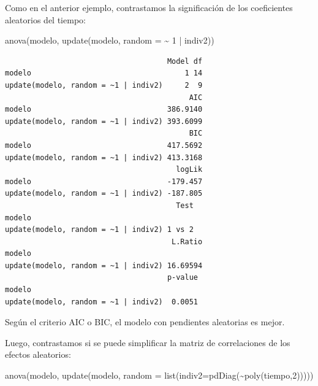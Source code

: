 \documentclass[
]{book}
\newenvironment{Shaded}{\begin{snugshade}}{\end{snugshade}}
\newcommand{\AttributeTok}[1]{\textcolor[rgb]{0.77,0.63,0.00}{#1}}
\newcommand{\DecValTok}[1]{\textcolor[rgb]{0.00,0.00,0.81}{#1}}
\newcommand{\FunctionTok}[1]{\textcolor[rgb]{0.00,0.00,0.00}{#1}}
\newcommand{\NormalTok}[1]{#1}
\newcommand{\SpecialCharTok}[1]{\textcolor[rgb]{0.00,0.00,0.00}{#1}}
\begin{document}
Como en el anterior ejemplo, contrastamos la significación de los coeficientes aleatorios del tiempo:

\begin{Shaded}
\begin{Highlighting}[]
\FunctionTok{anova}\NormalTok{(modelo, }\FunctionTok{update}\NormalTok{(modelo, }\AttributeTok{random =} \SpecialCharTok{\textasciitilde{}} \DecValTok{1} \SpecialCharTok{|}\NormalTok{ indiv2))}
\end{Highlighting}
\end{Shaded}

\begin{verbatim}
                                     Model df
modelo                                   1 14
update(modelo, random = ~1 | indiv2)     2  9
                                          AIC
modelo                               386.9140
update(modelo, random = ~1 | indiv2) 393.6099
                                          BIC
modelo                               417.5692
update(modelo, random = ~1 | indiv2) 413.3168
                                       logLik
modelo                               -179.457
update(modelo, random = ~1 | indiv2) -187.805
                                       Test
modelo                                     
update(modelo, random = ~1 | indiv2) 1 vs 2
                                      L.Ratio
modelo                                       
update(modelo, random = ~1 | indiv2) 16.69594
                                     p-value
modelo                                      
update(modelo, random = ~1 | indiv2)  0.0051
\end{verbatim}

Según el criterio AIC o BIC, el modelo con pendientes aleatorias es mejor.

Luego, contrastamos si se puede simplificar la matriz de correlaciones de los efectos aleatorios:

\begin{Shaded}
\begin{Highlighting}[]
\FunctionTok{anova}\NormalTok{(modelo, }\FunctionTok{update}\NormalTok{(modelo, }\AttributeTok{random =} \FunctionTok{list}\NormalTok{(}\AttributeTok{indiv2=}\FunctionTok{pdDiag}\NormalTok{(}\SpecialCharTok{\textasciitilde{}}\FunctionTok{poly}\NormalTok{(tiempo,}\DecValTok{2}\NormalTok{)))))}
\end{Highlighting}
\end{Shaded}
\end{document}
